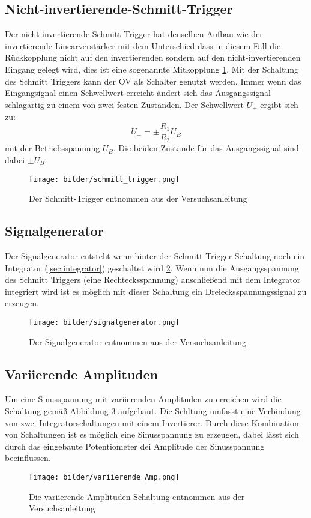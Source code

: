     \subsection{Nicht-invertierende-Schmitt-Trigger}
        Der nicht-invertierende Schmitt Trigger hat denselben Aufbau wie der invertierende Linearverstärker mit dem Unterschied dass in diesem Fall die Rückkopplung nicht auf den invertierenden sondern auf den nicht-invertierenden Eingang gelegt wird, dies ist eine sogenannte Mitkopplung \ref{fig:schmitt_trigger}.
        Mit der Schaltung des Schmitt Triggers kann der OV als Schalter genutzt werden.
        Immer wenn das Eingangsignal einen Schwellwert erreicht ändert sich das Ausgangssignal schlagartig zu einem von zwei festen Zuständen.
        Der Schwellwert $U_+$ ergibt sich zu:
        \begin{equation*}
            U_+  = \pm \frac{R_1}{R_2}U_B
        \end{equation*}
        mit der Betriebsspannung $U_B$. 
        Die beiden Zustände für das Ausgangssignal sind dabei $\pm U_B$.
        \begin{figure}[ht]
            \centering
            \texttt{[image: bilder/schmitt\_trigger.png]}
            \caption{Der Schmitt-Trigger entnommen aus der Versuchsanleitung}
            \label{fig:schmitt_trigger}
        \end{figure}
    \subsection{Signalgenerator}
        Der Signalgenerator entsteht wenn hinter der Schmitt Trigger Schaltung noch ein Integrator (\ref{sec:integrator}) geschaltet wird \ref{fig:signalgenerator}.
        Wenn nun die Ausgangsspannung des Schmitt Triggers (eine Rechtecksspannung) anschließend mit dem Integrator integriert wird ist es möglich mit dieser Schaltung ein Dreiecksspannungssignal zu erzeugen.
        \begin{figure}[ht]
            \centering
            \texttt{[image: bilder/signalgenerator.png]}
            \caption{Der Signalgenerator entnommen aus der Versuchsanleitung}
            \label{fig:signalgenerator}
        \end{figure}
    \subsection{Variierende Amplituden}
        Um eine Sinusspannung mit variierenden Amplituden zu erreichen wird die Schaltung gemäß Abbildung \ref{fig:variierende_Amp} aufgebaut.
        Die Schltung umfasst eine Verbindung von zwei Integratorschaltungen mit einem Invertierer.
        Durch diese Kombination von Schaltungen ist es möglich eine Sinusspannung zu erzeugen, dabei lässt sich durch das eingebaute Potentiometer dei Amplitude der Sinusspannung beeinflussen.
        \begin{figure}[ht]
            \centering
            \texttt{[image: bilder/variierende\_Amp.png]}
            \caption{Die variierende Amplituden Schaltung entnommen aus der Versuchsanleitung}
            \label{fig:variierende_Amp}
        \end{figure}